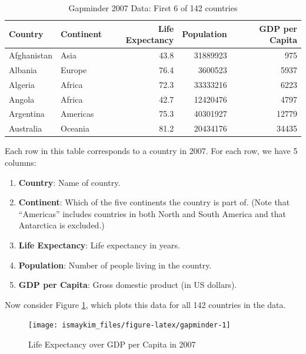 \documentclass[12pt, krantz2,]{krantz}
\providecommand{\tightlist}{%
  \setlength{\itemsep}{0pt}\setlength{\parskip}{0pt}}
\begin{document}
\begin{table}[H]

\caption{\label{tab:gapminder-2007}Gapminder 2007 Data: First 6 of 142 countries}
\centering
\fontsize{10}{12}\selectfont
\begin{tabular}{llrrr}
\toprule
Country & Continent & Life Expectancy & Population & GDP per Capita\\
\midrule
Afghanistan & Asia & 43.8 & 31889923 & 975\\
Albania & Europe & 76.4 & 3600523 & 5937\\
Algeria & Africa & 72.3 & 33333216 & 6223\\
Angola & Africa & 42.7 & 12420476 & 4797\\
Argentina & Americas & 75.3 & 40301927 & 12779\\
\addlinespace
Australia & Oceania & 81.2 & 20434176 & 34435\\
\bottomrule
\end{tabular}
\end{table}

Each row in this table corresponds to a country in 2007. For each row, we have 5 columns:

\begin{enumerate}
\def\labelenumi{\arabic{enumi}.}
\tightlist
\item
  \textbf{Country}: Name of country.
\item
  \textbf{Continent}: Which of the five continents the country is part of. (Note that ``Americas'' includes countries in both North and South America and that Antarctica is excluded.)
\item
  \textbf{Life Expectancy}: Life expectancy in years.
\item
  \textbf{Population}: Number of people living in the country.
\item
  \textbf{GDP per Capita}: Gross domestic product (in US dollars).
\end{enumerate}

Now consider Figure \ref{fig:gapminder}, which plots this data for all 142 countries in the data.

\begin{figure}

{\centering \texttt{[image: ismaykim\_files/figure-latex/gapminder-1]} 

}

\caption{Life Expectancy over GDP per Capita in 2007}\label{fig:gapminder}
\end{figure}
\end{document}
